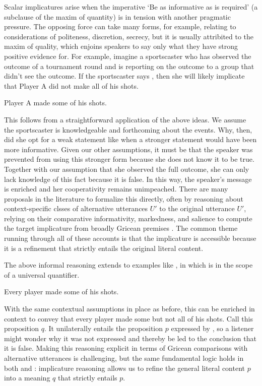 \documentclass{article}
\begin{document}
Scalar implicatures arise when the imperative `Be as informative as is
required' (a subclause of the maxim of quantity) is in tension with
another pragmatic pressure. The opposing force can take many forms,
for example, relating to considerations of politeness, discretion,
secrecy, but it is usually attribited to the maxim of quality, which
enjoins speakers to say only what they have strong positive evidence
for. For example, imagine a sportscaster who has observed the outcome
of a tournament round and is reporting on the outcome to a group that
didn't see the outcome. If the sportscaster says , then she
will likely implicate that Player A did not make all of his shots.
%
\begin{examples}
\item\label{some} Player A made some of his shots.
\end{examples}
%
This follows from a straightforward application of the above ideas. We
assume the sportscaster is knowledgeable and forthcoming about the
events. Why, then, did she opt for a weak statement like  when a stronger statement  would have been more informative. Given our
other assumptions, it must be that the speaker was prevented from
using this stronger form because she does not know it to be
true. Together with our assumption that she observed the full outcome,
she can only lack knowledge of this fact because it is false. In this
way, the speaker's message is enriched and her cooperativity remains
unimpeached. There are many proposals in the literature to formalize
this directly, often by reasoning about context-specific clsses of
alternative utterances $U'$ to the original utterance $U'$, relying on
their comparative informativity, markedness, and salience to compute
the target implicature from broadly Gricean premises
\citep{Horn72,Gazdar79b,Gazdar79a,SchulzVanRooij06}. The common theme
running through all of these accounts is that the implicature is
accessible because it is a refinement that strictly entails the
original literal content.

The above informal reasoning extends to examples like ,
in which  is in the scope of a universal quantifier.
%
\begin{examples}
\item\label{everysome} Every player made some of his shots.
\end{examples}
%
With the same contextual assumptions in place as before, this can be
enriched in context to convey that every player made some but not all
of his shots. Call this proposition $q$. It unilaterally entails the
proposition $p$ expressed by , so a listener might
wonder why it was not expressed and thereby be led to the conclusion
that it is false. Making this reasoning explicit in terms of Gricean
comparisons with alternative utterances is challenging, but the same
fundamental logic holds in both  and :
implicature reasoning allows us to refine the general literal content
$p$ into a meaning $q$ that strictly entails $p$.
\end{document}

